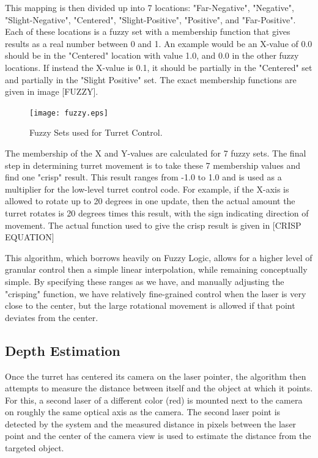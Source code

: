 \documentclass[10pt,twocolumn,letterpaper]{article}
\begin{document}
This mapping is then divided up into 7 locations:  "Far-Negative", "Negative", "Slight-Negative", "Centered", "Slight-Positive", "Positive", and "Far-Positive". Each of these locations is a fuzzy set with a membership function that gives results as a real number between 0 and 1. An example would be an X-value of 0.0 should be in the "Centered" location with value 1.0, and 0.0 in the other fuzzy locations. If instead the X-value is 0.1, it should be partially in the "Centered" set and partially in the "Slight Positive" set. The exact membership functions are given in image [FUZZY].

\begin{figure}[t]
\begin{center}
  \texttt{[image: fuzzy.eps]}
\end{center}
   \caption{Fuzzy Sets used for Turret Control.}
\end{figure}

The membership of the X and Y-values are calculated for 7 fuzzy sets. The final step in determining turret movement is to take these 7 membership values and find one "crisp" result. This result ranges from -1.0 to 1.0 and is used as a multiplier for the low-level turret control code. For example, if the X-axis is allowed to rotate up to 20 degrees in one update, then the actual amount the turret rotates is 20 degrees times this result, with the sign indicating direction of movement. The actual function used to give the crisp result is given in [CRISP EQUATION]

This algorithm, which borrows heavily on Fuzzy Logic, allows for a higher level of granular control then a simple linear interpolation, while remaining conceptually simple. By specifying these ranges as we have, and manually adjusting the "crisping" function, we have relatively fine-grained control when the laser is very close to the center, but the large rotational movement is allowed if that point deviates from the center.

\subsection{Depth Estimation}

Once the turret has centered its camera on the laser pointer, the algorithm then attempts to measure the distance between itself and the object at which it points.  For this, a second laser of a different color (red) is mounted next to the camera on roughly the same optical axis as the camera.  The second laser point is detected by the system and the measured distance in pixels between the laser point and the center of the camera view is used to estimate the distance from the targeted object.
\end{document}
